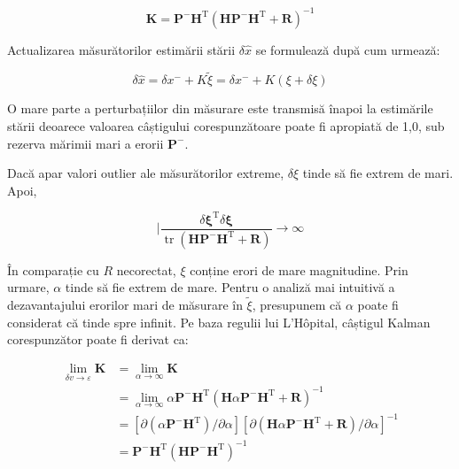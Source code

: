 \documentclass[10pt]{report}
\begin{document}
\begin{equation}
  \boldsymbol{K}=\boldsymbol{P}^{-} \boldsymbol{H}^{\mathrm{T}}\left(\boldsymbol{H} \boldsymbol{P}^{-} \boldsymbol{H}^{\mathrm{T}}+\boldsymbol{R}\right)^{-1}
\end{equation}


Actualizarea măsurătorilor estimării stării $\delta \hat{x}$ se formulează după cum urmează:

\begin{equation}
  \delta \hat{x}=\delta x^{-}+K \widetilde{\xi}=\delta x^{-}+K(\xi+\delta \xi)
\end{equation}


O mare parte a perturbațiilor din măsurare este transmisă înapoi la estimările stării deoarece valoarea câștigului corespunzătoare poate fi apropiată de 1,0, sub rezerva mărimii mari a erorii $\boldsymbol{P}^{-}$.

Dacă apar valori outlier ale măsurătorilor extreme, $\delta \xi$ tinde să fie extrem de mari. Apoi,

\begin{equation}
  \mid \frac{\delta \boldsymbol{\xi}^{\mathrm{T}} \delta \boldsymbol{\xi}}{\operatorname{tr}\left(\boldsymbol{H} \boldsymbol{P}^{-} \boldsymbol{H}^{\mathrm{T}}+\boldsymbol{R}\right)} \rightarrow \infty
\end{equation}

În comparație cu $R$ necorectat, $\xi$ conține erori de mare magnitudine. Prin urmare, $\alpha$ tinde să fie extrem de mare. Pentru o analiză mai intuitivă a dezavantajului erorilor mari de măsurare în $\widetilde{\xi}$, presupunem că $\alpha$ poate fi considerat că tinde spre infinit. Pe baza regulii lui L'Hôpital, câștigul Kalman corespunzător poate fi derivat ca:

\begin{equation}
  \begin{aligned}
    \lim _{\delta v \rightarrow \varepsilon} \boldsymbol{K} & =\lim _{\alpha \rightarrow \infty} \boldsymbol{K}                                                                                                                                                                                                      \\
                                                            & =\lim _{\alpha \rightarrow \infty} \alpha \boldsymbol{P}^{-} \boldsymbol{H}^{\mathrm{T}}\left(\boldsymbol{H} \alpha \boldsymbol{P}^{-} \boldsymbol{H}^{\mathrm{T}}+\boldsymbol{R}\right)^{-1}                                                          \\
                                                            & =\left[\partial\left(\alpha \boldsymbol{P}^{-} \boldsymbol{H}^{\mathrm{T}}\right) / \partial \alpha\right]\left[\partial\left(\boldsymbol{H} \alpha \boldsymbol{P}^{-} \boldsymbol{H}^{\mathrm{T}}+\boldsymbol{R}\right) / \partial \alpha\right]^{-1} \\
                                                            & =\boldsymbol{P}^{-} \boldsymbol{H}^{\mathrm{T}}\left(\boldsymbol{H} \boldsymbol{P}^{-} \boldsymbol{H}^{\mathrm{T}}\right)^{-1}
  \end{aligned}
\end{equation}
\end{document}
